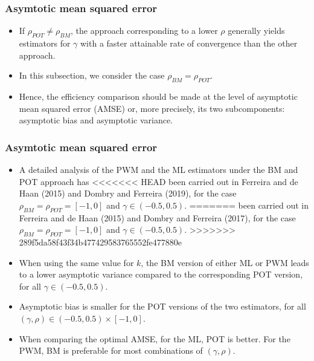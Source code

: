 \documentclass{beamer}
\begin{document}
\begin{frame}
    \frametitle{Asymtotic mean squared error}
\begin{itemize}
    \item If $\rho_{POT}\ne \rho_{BM}$, the approach corresponding to a lower $\rho$ generally yields estimators for $\gamma$ with a faster attainable rate of convergence than the other approach.
    \item In this subsection, we consider the case $\rho_{BM}=\rho_{POT}$.
    \item Hence, the efficiency comparison should be made at the level of asymptotic mean squared error
    (AMSE) or, more precisely, its two subcomponents: asymptotic bias and asymptotic variance.
\end{itemize}
    

\end{frame}

\begin{frame}
    \frametitle{Asymtotic mean squared error}

    \begin{itemize}
        \item A detailed analysis of the PWM and the ML estimators under the BM and POT approach has
<<<<<<< HEAD
        been carried out in Ferreira and de Haan (2015) and Dombry and Ferreira (2019), for the case $\rho_{BM}=\rho_{POT}=[-1,0]$ and $\gamma\in (-0.5,0.5)$.
=======
        been carried out in Ferreira and de Haan (2015) and Dombry and Ferreira (2017), for the case $\rho_{BM}=\rho_{POT}=[-1,0]$ and $\gamma\in (-0.5,0.5)$.
>>>>>>> 289f5da58f43f34b477429583765552fe477880e
        \item When using the same value for $k$, the BM version of either ML or PWM     leads to a lower asymptotic         variance compared to the corresponding POT version, for all $\gamma\in (-0.5,0.5)$.
        \item Asymptotic bias is smaller for the POT versions of the two estimators, for all $(\gamma,\rho)\in (-0.5,0.5)\times [-1,0]$.
        \item When comparing the optimal AMSE, for the ML, POT is better. For the PWM, BM is preferable for most combinations of $(\gamma,\rho)$.
    \end{itemize}

\end{frame}
\end{document}
